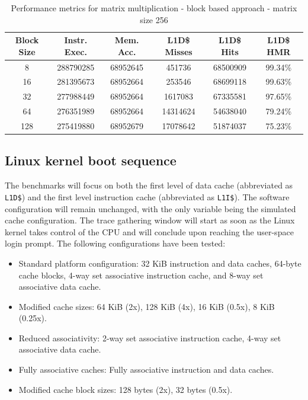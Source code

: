 \begin{center}
\begin{table}[!htbp]
\centering
\begin{tabular}{|c|c|c|c|c|c|}
\hline
\textbf{Block Size} & \textbf{Instr. Exec.} & \textbf{Mem. Acc.} & \textbf{L1D\$ Misses} & \textbf{L1D\$ Hits} & \textbf{L1D\$ HMR} \\ \hline
8 & 288790285 & 68952645 & 451736 & 68500909 & 99.34\% \\ \hline
16 & 281395673 & 68952664 & 253546 & 68699118 & 99.63\% \\ \hline
32 & 277988449 & 68952664 & 1617083 & 67335581 & 97.65\% \\ \hline
64 & 276351989 & 68952664 & 14314624 & 54638040 & 79.24\% \\ \hline
128 & 275419880 & 68952679 & 17078642 & 51874037 & 75.23\% \\ \hline
\end{tabular}
\caption{Performance metrics for matrix multiplication - block based approach - matrix size 256}
\label{tab:performance_metrics_256}
\end{table}
\end{center}


\subsection{Linux kernel boot sequence}

The benchmarks will focus on both the first level of data cache (abbreviated as \texttt{L1D\$}) and the first level instruction cache (abbreviated as \texttt{L1I\$}). The software
configuration will remain unchanged, with the only variable being the simulated cache configuration. The trace gathering window will start as soon as the Linux kernel takes
control of the CPU and will conclude upon reaching the user-space login prompt. The following configurations have been tested:

\begin{itemize}
    \item Standard platform configuration: 32 KiB instruction and data caches, 64-byte cache blocks, 4-way set associative instruction cache, and 8-way set associative data cache.
    \item Modified cache sizes: 64 KiB (2x), 128 KiB (4x), 16 KiB (0.5x), 8 KiB (0.25x).
    \item Reduced associativity: 2-way set associative instruction cache, 4-way set associative data cache.
    \item Fully associative caches: Fully associative instruction and data caches.
    \item Modified cache block sizes: 128 bytes (2x), 32 bytes (0.5x).
\end{itemize}

